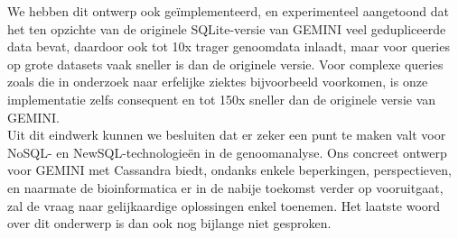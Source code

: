 We hebben dit ontwerp ook ge\"implementeerd, en experimenteel aangetoond dat het ten opzichte van de originele SQLite-versie van GEMINI veel gedupliceerde data bevat, daardoor ook tot 10x trager genoomdata inlaadt, maar voor queries op grote datasets vaak sneller is dan de originele versie. Voor complexe queries zoals die in onderzoek naar erfelijke ziektes bijvoorbeeld voorkomen, is onze implementatie zelfs consequent en tot 150x sneller dan de originele versie van GEMINI.\\
Uit dit eindwerk kunnen we besluiten dat er zeker een punt te maken valt voor NoSQL- en NewSQL-technologie\"en in de genoomanalyse. Ons concreet ontwerp voor GEMINI met Cassandra biedt, ondanks enkele beperkingen, perspectieven, en naarmate de bioinformatica er in de nabije toekomst verder op vooruitgaat, zal de vraag naar gelijkaardige oplossingen enkel toenemen. Het laatste woord over dit onderwerp is dan ook nog bijlange niet gesproken.